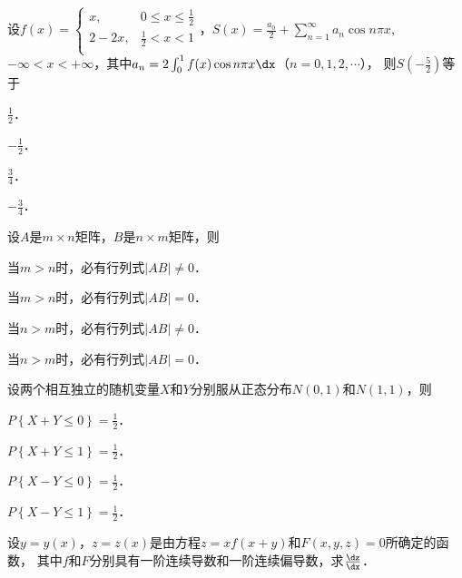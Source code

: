 \documentclass[plain,noanswer,medmath]{../../template/jnuexam}
\begin{document}
\begin{problem}
设$f(x) = \begin{cases}
  x, & 0 \le x \le \frac{1}{2} \\
  2 - 2x, & \frac{1}{2} < x < 1 \\
\end{cases}$，$S(x) = \frac{a_0}{2} + \sum_{n = 1}^{\infty}a_n\cos n\pi x$,
$-\infty < x < +\infty$，其中$a_n = 2\int_0^1 f(x)\cos n\pi x\dx$（$n = 0,1,2,\cdots$），
则$S\left(- \frac{5}{2} \right)$等于\pickout{}
\begin{abcd}
  \item $\frac{1}{2}$．
  \item $- \frac{1}{2}$．
  \item $\frac{3}{4}$．
  \item $- \frac{3}{4}$．
\end{abcd}
\end{problem}


\begin{problem}
设$A$是$m \times n$矩阵，$B$是$n \times m$矩阵，则\pickout{}
\begin{abcd}
\item 当$m > n$时，必有行列式$|AB| \ne 0$．
\item 当$m > n$时，必有行列式$|AB| = 0$．
\item 当$n > m$时，必有行列式$|AB| \ne 0$．
\item 当$n > m$时，必有行列式$|AB| = 0$．
\end{abcd}
\end{problem}


\begin{problem}
设两个相互独立的随机变量$X$和$Y$分别服从正态分布$N(0,1)$和$N(1,1)$，则\pickout{}
\begin{abcd}
\item $P\left\{X + Y \le 0 \right\} = \frac{1}{2}$．
\item $P\left\{X + Y \le 1 \right\} = \frac{1}{2}$．
\item $P\left\{X - Y \le 0 \right\} = \frac{1}{2}$．
\item $P\left\{X - Y \le 1 \right\} = \frac{1}{2}$．
\end{abcd}
\end{problem}



\begin{problem}
设$y = y(x)$，$z = z(x)$是由方程$z = xf(x + y)$和$F(x,y,z) = 0$所确定的函数，
其中$f$和$F$分别具有一阶连续导数和一阶连续偏导数，求$\frac{\dz}{\dx}$．
\end{problem}
\end{document}
